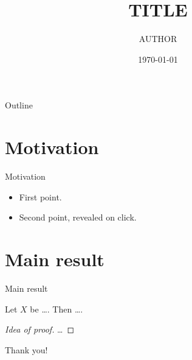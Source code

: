 \documentclass[11pt]{beamer}
\title{{{TITLE}}}
\author{{{AUTHOR}}}
\institute{Department of Mathematics, University}
\date{\today}
\begin{document}
\begin{frame}
  \titlepage
\end{frame}

\begin{frame}{Outline}
  \tableofcontents
\end{frame}

\section{Motivation}
\begin{frame}{Motivation}
  \begin{itemize}
    \item First point.
    \item<2-> Second point, revealed on click.
  \end{itemize}
\end{frame}

\section{Main result}
\begin{frame}{Main result}
  \begin{theorem}
    Let $X$ be \dots. Then \dots.
  \end{theorem}
  \begin{proof}[Idea of proof]
    \dots
  \end{proof}
\end{frame}

\begin{frame}
  \centering \Large Thank you!
\end{frame}
\end{document}
